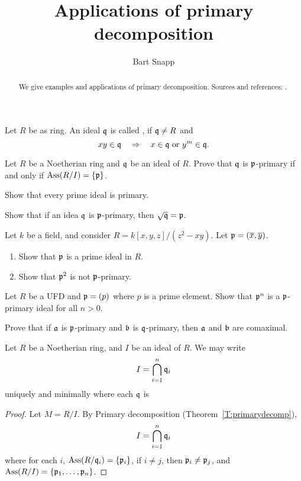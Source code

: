 \documentclass{ximera}
\author{Bart Snapp}
\title{Applications of primary decomposition}
\begin{document}
\begin{abstract}
  We give examples and applications of primary decomposition. Sources
  and references: \cite{AM1969,sD2008,dE1995}.
\end{abstract}
\maketitle



\begin{definition}
  Let $R$ be as ring. An ideal $\mathfrak{q}$ is called , if $\mathfrak{q}\ne
  R$ and
  \[
  xy\in\mathfrak{q} \quad \Rightarrow \quad x\in\mathfrak{q}\text{ or }y^m\in\mathfrak{q}.
  \]
\end{definition}

\begin{exercise}
  Let $R$ be a Noetherian ring and $\mathfrak{q}$ be an ideal of $R$. Prove that
  $\mathfrak{q}$ is $\mathfrak{p}$-primary if and only if $\operatorname{Ass}(R/I) = \{\mathfrak{p}\}$.
\end{exercise}

\begin{exercise}
  Show that every prime ideal is primary.
\end{exercise}

\begin{exercise}
  Show that if an idea $\mathfrak{q}$ is $\mathfrak{p}$-primary, then $\sqrt{\mathfrak{q}} = \mathfrak{p}$.
\end{exercise}

\begin{exercise}
  Let $k$ be a field, and consider $R=k[x,y,z]/(z^2-xy)$. Let $\mathfrak{p} = (\overline{x},\overline{y})$.
  \begin{enumerate}
  \item Show that $\mathfrak{p}$ is a prime ideal in $R$.
  \item Show that $\mathfrak{p}^2$ is not $\mathfrak{p}$-primary.
  \end{enumerate}
\end{exercise}

\begin{exercise}
  Let $R$ be a UFD and $\mathfrak{p} = (p)$ where $p$ is a prime element. Show
  that $\mathfrak{p}^n$ is a $\mathfrak{p}$-primary ideal for all $n>0$.
\end{exercise}

\begin{exercise}
  Prove that if $\mathfrak{a}$ is $\mathfrak{p}$-primary and $\mathfrak{b}$ is $\mathfrak{q}$-primary, then
  $\mathfrak{a}$ and $\mathfrak{b}$ are comaximal.
\end{exercise}



\begin{theorem}
  Let $R$ be a Noetherian ring, and $I$ be an ideal of $R$. We may write
  \[
  I = \bigcap_{i=1}^n \mathfrak{q}_i
  \]
  uniquely and minimally where each $\mathfrak{q}$ is 
  \begin{proof}
    Let $M = R/I$. By Primary decomposition (Theorem~\ref{T:primarydecomp}),
    \[
    I = \bigcap_{i=1}^n \mathfrak{q}_i
    \]
    where for each $i$, $\operatorname{Ass}(R/\mathfrak{q}_i) = \{\mathfrak{p}_i\}$, if $i\ne j$, then
    $\mathfrak{p}_i\ne\mathfrak{p}_j$, and $\operatorname{Ass}(R/I) = \{\mathfrak{p}_1,\dots,\mathfrak{p}_n\}$.
  \end{proof}
\end{theorem}
\end{document}
